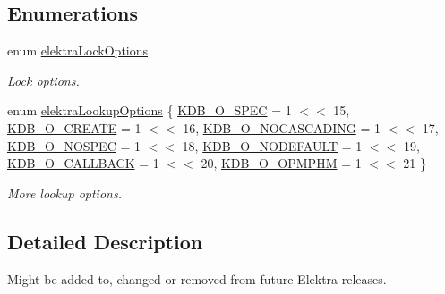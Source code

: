 \subsection*{Enumerations}
\begin{DoxyCompactItemize}
\item 
\mbox{\label{group__proposal_ga824e384e248ed1e05448294bff7271c0}} 
enum \hyperlink{group__proposal_ga824e384e248ed1e05448294bff7271c0}{elektra\+Lock\+Options} \begin{DoxyCompactList}\small\item\em Lock options. \end{DoxyCompactList}
\item 
enum \hyperlink{group__proposal_ga93673533c4c8eb1fdfca76b98c5f49b0}{elektra\+Lookup\+Options} \{ \newline
\hyperlink{group__proposal_gga93673533c4c8eb1fdfca76b98c5f49b0a187bc7e52493fb8f1eb5693015478dae}{K\+D\+B\+\_\+\+O\+\_\+\+S\+P\+EC} = 1 $<$$<$ 15, 
\hyperlink{group__proposal_gga93673533c4c8eb1fdfca76b98c5f49b0a72155bedec545b2e96372ab28169620a}{K\+D\+B\+\_\+\+O\+\_\+\+C\+R\+E\+A\+TE} = 1 $<$$<$ 16, 
\hyperlink{group__proposal_gga93673533c4c8eb1fdfca76b98c5f49b0abc4c6e04823b6d684f4db8df3b84f326}{K\+D\+B\+\_\+\+O\+\_\+\+N\+O\+C\+A\+S\+C\+A\+D\+I\+NG} = 1 $<$$<$ 17, 
\hyperlink{group__proposal_gga93673533c4c8eb1fdfca76b98c5f49b0a420d8ea3671ffea4fe8400570cfe5c8d}{K\+D\+B\+\_\+\+O\+\_\+\+N\+O\+S\+P\+EC} = 1 $<$$<$ 18, 
\newline
\hyperlink{group__proposal_gga93673533c4c8eb1fdfca76b98c5f49b0abdcfd6d28200b5c650615fba430496bb}{K\+D\+B\+\_\+\+O\+\_\+\+N\+O\+D\+E\+F\+A\+U\+LT} = 1 $<$$<$ 19, 
\hyperlink{group__proposal_gga93673533c4c8eb1fdfca76b98c5f49b0a70ac5d04d6f855e17e4c33dfeeddd39e}{K\+D\+B\+\_\+\+O\+\_\+\+C\+A\+L\+L\+B\+A\+CK} = 1 $<$$<$ 20, 
\hyperlink{group__proposal_gga93673533c4c8eb1fdfca76b98c5f49b0afe9f6ff6e374540baf600a918b07ee6e}{K\+D\+B\+\_\+\+O\+\_\+\+O\+P\+M\+P\+HM} = 1 $<$$<$ 21
 \}\begin{DoxyCompactList}\small\item\em More lookup options. \end{DoxyCompactList}
\end{DoxyCompactItemize}


\subsection{Detailed Description}
Might be added to, changed or removed from future Elektra releases. 



